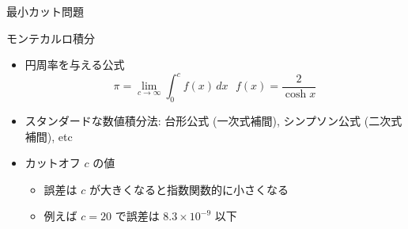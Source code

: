 \documentclass[dvipdfmx]{beamer}
\begin{document}
\begin{frame}[t,fragile]{最小カット問題}
\end{frame}

\begin{frame}[t,fragile]{モンテカルロ積分}
  \begin{itemize}
    \setlength{\itemsep}{1em}
  \item 円周率を与える公式
    \[
    \pi = \lim_{c \rightarrow \infty} \int_0^c f(x) \, dx \ \ \ f(x) = \frac{2}{\cosh x}
    \]
  \item スタンダードな数値積分法: 台形公式 (一次式補間), シンプソン公式 (二次式補間), etc
  \item カットオフ $c$ の値
    \begin{itemize}
    \item 誤差は $c$ が大きくなると指数関数的に小さくなる
    \item 例えば $c = 20$ で誤差は $8.3 \times 10^{-9}$ 以下
    \end{itemize}
  \end{itemize}
\end{frame}
\end{document}

